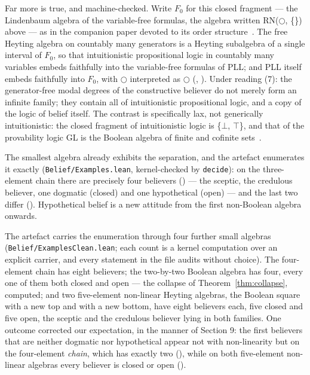 Far more is true, and machine-checked. Write \ensuremath{F_{0}} for this
closed fragment --- the Lindenbaum algebra of the variable-free
formulas, the algebra written RN(\ensuremath{\bigcirc}, \{\}) above --- as
in the companion paper devoted to its order structure~\cite{F0Paper}.
The free Heyting algebra on countably many generators is a Heyting
subalgebra of a single interval of \ensuremath{F_{0}}, so that
intuitionistic propositional logic in countably many variables embeds
faithfully into the variable-free formulas of PLL; and PLL itself
embeds faithfully into \ensuremath{F_{0}}, with \ensuremath{\bigcirc}
interpreted as \ensuremath{\bigcirc}
(, ). Under reading
(7): the generator-free modal degrees of the constructive believer do
not merely form an infinite family; they contain all of intuitionistic
propositional logic, and a copy of the logic of belief itself. The
contrast is specifically lax, not generically intuitionistic: the
closed fragment of intuitionistic logic is \{\ensuremath{\bot},
\ensuremath{\top}\}, and that of the provability logic GL is the
Boolean algebra of finite and cofinite sets~\cite{Boolos1993}.

The smallest algebra already exhibits the separation, and the artefact
enumerates it exactly (\texttt{Belief/\allowbreak{}Examples.lean}, kernel-checked by
\texttt{decide}): on the three-element chain there are precisely four
believers () --- the sceptic, the credulous believer, one
dogmatic (closed) and one hypothetical (open) --- and the last two
differ (). Hypothetical belief is a new
attitude from the first non-Boolean algebra onwards.

The artefact carries the enumeration through four further small
algebras (\texttt{Belief/\allowbreak{}ExamplesClean.lean}; each count is
a kernel computation over an explicit carrier, and every statement in
the file audits without choice). The four-element chain has eight
believers; the two-by-two Boolean algebra has four, every one of them
both closed and open --- the collapse of Theorem~\ref{thm:collapse},
computed; and two five-element non-linear Heyting algebras, the
Boolean square with a new top and with a new bottom, have eight
believers each, five closed and five open, the sceptic and the
credulous believer lying in both families. One outcome corrected our
expectation, in the manner of Section 9: the first believers that are
neither dogmatic nor hypothetical appear not with non-linearity but on
the four-element \emph{chain}, which has exactly two
(), while on both five-element non-linear algebras
every believer is closed or open ().

